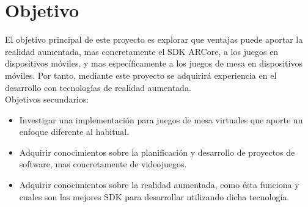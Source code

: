 \section{Objetivo}
El objetivo principal de este proyecto es explorar que ventajas puede aportar la realidad aumentada, mas concretamente el SDK ARCore, a los juegos en dispositivos móviles, y mas específicamente a los juegos de mesa en dispositivos móviles. Por tanto, mediante este proyecto se adquirirá experiencia en el desarrollo con tecnologías de realidad aumentada.\\

Objetivos secundarios:
\begin{itemize}
  \item Investigar una implementación para juegos de mesa virtuales que aporte un enfoque diferente al habitual.
  \item Adquirir conocimientos sobre la planificación y desarrollo de proyectos de software, mas concretamente de videojuegos.
  \item Adquirir conocimientos sobre la realidad aumentada, como ésta funciona y cuales son las mejores SDK para desarrollar utilizando dicha tecnología.
\end{itemize}
